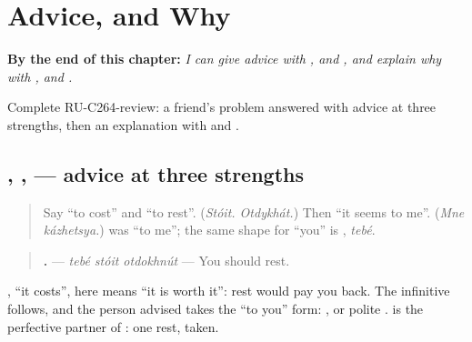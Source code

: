 
\chapter{Advice, and Why}
\label{ch:ru-advice-and-why}

\begin{chapteropening}
\textbf{By the end of this chapter:} \emph{I can give advice with  ,   and , and explain why with   ,  and .}

Complete RU-C264-review: a friend's problem answered with advice at three strengths, then an explanation with   and .
\end{chapteropening}

\section[\texorpdfstring{\ru{тебе} \ru{стоит} … … (tebé stóit … …)}{тебе стоит … … (tebé stóit … …)}]{ , ,   — advice at three strengths}

\label{lesson:RU-C264-tebe-stoit}



\begin{quote}
Say \textquotedblleft{}to cost\textquotedblright{} and \textquotedblleft{}to rest\textquotedblright{}. (\emph{Stóit. Otdykhát.}) Then \textquotedblleft{}it seems to me\textquotedblright{}. (\emph{Mne kázhetsya.}) \emph{} was \textquotedblleft{}to me\textquotedblright{}; the same shape for \textquotedblleft{}you\textquotedblright{} is \textbf{}, \emph{tebé}.
\end{quote}

\begin{grammarlens}[title={Grammar Lens: \ru{тебе} \ru{стоит}, it is worth your while}]
\begin{quote}
\textbf{  .} — \emph{tebé stóit otdokhnút} — You should rest.
\end{quote}

\textbf{}, \textquotedblleft{}it costs\textquotedblright{}, here means \textquotedblleft{}it is worth it\textquotedblright{}: rest would pay you back. The infinitive follows, and the person advised takes the \textquotedblleft{}to you\textquotedblright{} form: \textbf{}, or polite \textbf{}. \emph{} is the perfective partner of \emph{}: one rest, taken.
\end{grammarlens}

